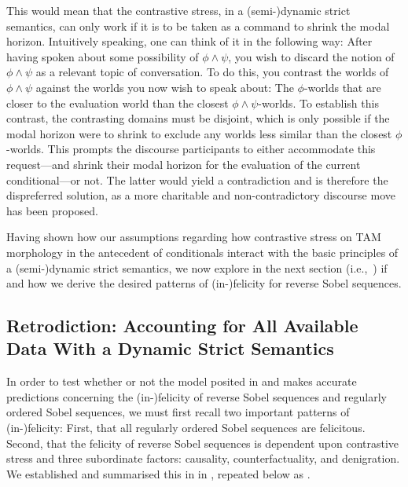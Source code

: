 This would mean that the contrastive stress, in a (semi-)dynamic strict semantics, can only work if it is to be taken as a command to shrink the modal horizon. Intuitively speaking, one can think of it in the following way: After having spoken about some possibility of $\phi\land\psi$, you wish to discard the notion of $\phi\land\psi$ as a relevant topic of conversation. To do this, you contrast the worlds of $\phi\land\psi$ against the worlds you now wish to speak about: The $\phi$-worlds that are closer to the evaluation world than the closest $\phi\land\psi$-worlds. To establish this contrast, the contrasting domains must be disjoint, which is only possible if the modal horizon were to shrink to exclude any worlds less similar than the closest $\phi$-worlds. This prompts the discourse participants to either accommodate this request---and shrink their modal horizon for the evaluation of the current conditional---or not. The latter would yield a contradiction and is therefore the dispreferred solution, as a more charitable and non-contradictory discourse move has been proposed.

Having shown how our assumptions regarding how contrastive stress on TAM morphology in the antecedent of conditionals interact with the basic principles of a (semi-)dynamic strict semantics, we now explore in the next section (i.e.,~) if and how we derive the desired patterns of (in-)felicity for reverse Sobel sequences.

\subsection{Retrodiction: Accounting for All Available Data With a Dynamic Strict Semantics}
In order to test whether or not the model posited in  and  makes accurate predictions concerning the (in-)felicity of reverse Sobel sequences and regularly ordered Sobel sequences, we must first recall two important patterns of (in-)felicity: First, that all regularly ordered Sobel sequences are felicitous. Second, that the felicity of reverse Sobel sequences is dependent upon contrastive stress and three subordinate factors: causality, counterfactuality, and denigration. We established and summarised this in  in , repeated below as .
\begin{table}[!htb]
\end{table}

